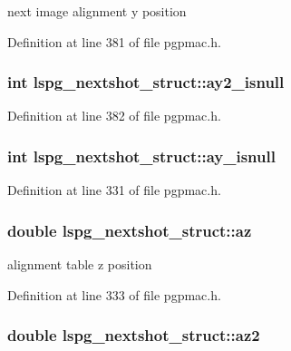 next image alignment y position 



Definition at line 381 of file pgpmac.\-h.

\hypertarget{structlspg__nextshot__struct_ad0f50ec6339296d3d39c8d95131ab6b5}{
\subsubsection[{ay2\-\_\-isnull}]{\setlength{\rightskip}{0pt plus 5cm}int lspg\-\_\-nextshot\-\_\-struct\-::ay2\-\_\-isnull}}\label{structlspg__nextshot__struct_ad0f50ec6339296d3d39c8d95131ab6b5}


Definition at line 382 of file pgpmac.\-h.

\hypertarget{structlspg__nextshot__struct_a9da91abc8090532ed98ccd47a3bab775}{
\subsubsection[{ay\-\_\-isnull}]{\setlength{\rightskip}{0pt plus 5cm}int lspg\-\_\-nextshot\-\_\-struct\-::ay\-\_\-isnull}}\label{structlspg__nextshot__struct_a9da91abc8090532ed98ccd47a3bab775}


Definition at line 331 of file pgpmac.\-h.

\hypertarget{structlspg__nextshot__struct_a66e678866ce79f6398b66d033ae45a17}{
\subsubsection[{az}]{\setlength{\rightskip}{0pt plus 5cm}double lspg\-\_\-nextshot\-\_\-struct\-::az}}\label{structlspg__nextshot__struct_a66e678866ce79f6398b66d033ae45a17}


alignment table z position 



Definition at line 333 of file pgpmac.\-h.

\hypertarget{structlspg__nextshot__struct_a94698a030fd5b2abf1f10a2ad33476a4}{
\subsubsection[{az2}]{\setlength{\rightskip}{0pt plus 5cm}double lspg\-\_\-nextshot\-\_\-struct\-::az2}}\label{structlspg__nextshot__struct_a94698a030fd5b2abf1f10a2ad33476a4}


